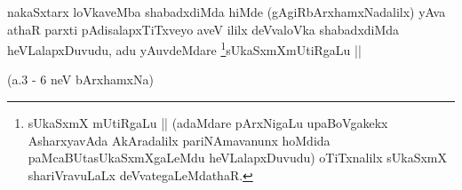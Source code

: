 \begin{artha}
nakaSxtarx loVkaveMba shabadxdiMda hiMde (gAgiRbArxhamxNadalilx) yAva
athaR parxti pAdisalapxTiTxveyo aveV ililx deVvaloVka shabadxdiMda
heVLalapxDuvudu, adu yAuvdeMdare \footnote[1]{sUkaSxmX mUtiRgaLu ||
  (adaMdare pArxNigaLu upaBoVgakekx AsharxyavAda AkAradalilx
  pariNAmavanunx hoMdida paMcaBUtasUkaSxmXgaLeMdu heVLalapxDuvudu)
  oTiTxnalilx sUkaSxmX shariVravuLaLx deVvategaLeMdathaR.}sUkaSxmXmUtiRgaLu ||
\end{artha}

(a.3 - 6 neV bArxhamxNa)  

